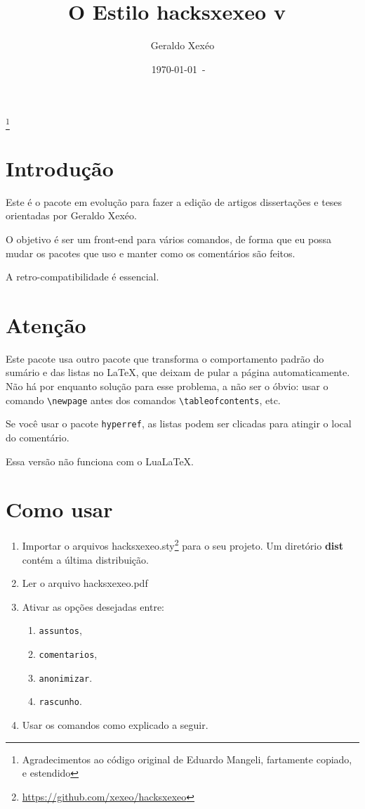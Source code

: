 \documentclass{article}
\title{O Estilo hacksxexeo v\ \hacksxexeoversion}
\author{Geraldo Xexéo}
\date{\today\ - \ \currenttime}
\begin{document}
\maketitle
\thanks{Agradecimentos ao código original de Eduardo Mangeli, fartamente copiado, e estendido}

\section{Introdução}

Este é o pacote em evolução para fazer a edição de artigos dissertações e teses orientadas por Geraldo Xexéo.

O objetivo é ser um front-end para vários comandos, de forma que eu possa mudar os pacotes que uso e manter como os comentários são feitos.

A retro-compatibilidade é essencial.

\section{Atenção}

Este pacote usa outro pacote que transforma o comportamento padrão do sumário e das listas no \LaTeX, que deixam de pular a página automaticamente. Não há por enquanto solução para esse problema, a não ser o óbvio: usar o comando \verb!\newpage! antes dos comandos \verb!\tableofcontents!, etc.

Se você usar o pacote \verb!hyperref!, as listas podem ser clicadas para atingir o local do comentário.

Essa versão não funciona com o Lua\LaTeX.

\section{Como usar}

\begin{enumerate}
    \item Importar o arquivos hacksxexeo.sty\footnote{\url{https://github.com/xexeo/hacksxexeo}} para o seu  projeto. Um diretório \textbf{dist} contém a última distribuição.
    \item Ler o arquivo hacksxexeo.pdf
    \item Ativar as opções desejadas entre:
    \begin{enumerate}
        \item \verb!assuntos!,
        \item \verb!comentarios!,
        \item \verb!anonimizar!.
        \item \verb!rascunho!.
    \end{enumerate}
    \item Usar os comandos como explicado a seguir.
\end{enumerate}
\end{document}

